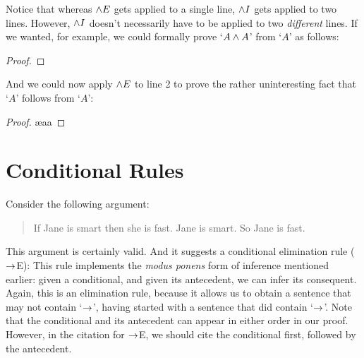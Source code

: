 Notice that whereas $\wedge E$ gets applied to a single line, $\wedge I$ gets applied to two lines.  However, $\wedge I$ doesn't necessarily have to be applied to two \emph{different} lines.   If we wanted, for example, we could formally prove `$A \wedge A$' from `$A$' as follows:
\begin{proof}
\end{proof}
And we could now apply $\wedge E$ to line 2 to prove the rather uninteresting fact that `$A$' follows from `$A$':

\begin{proof}
	\ae{aa}
\end{proof}

\section{Conditional Rules}
Consider the following argument:
	\begin{quote}
		If Jane is smart then she is fast. Jane is smart. So Jane is fast.
	\end{quote}
This argument is certainly valid. And it suggests a conditional elimination rule ($\rightarrow$E):
This rule implements the \emph{modus ponens} form of inference mentioned earlier: given a conditional, and given its antecedent, we can infer its consequent. Again, this is an elimination rule, because it allows us to obtain a sentence that may not contain `$\rightarrow$', having started with a sentence that did contain `$\rightarrow$'. Note that the conditional and its antecedent can appear in either order in our proof. However, in the citation for $\rightarrow$E, we should  cite the conditional first, followed by the antecedent.

